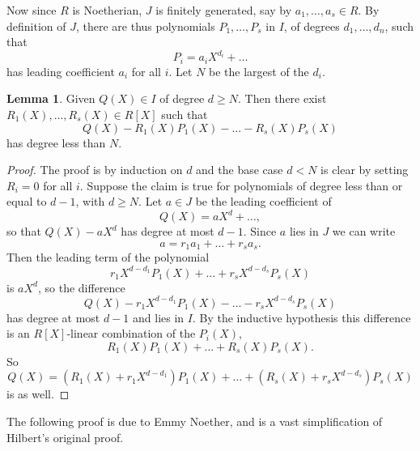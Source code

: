 \documentclass{article}
\newcommand{\rb}[1]{\left( #1 \right)}
\renewcommand{\sb}[1]{\left[ #1 \right]}
\theoremstyle{definition}\newtheorem{definition}{Definition}[subsection]
\theoremstyle{definition}\newtheorem{remark}[definition]{Remark}
\theoremstyle{definition}\newtheorem*{example}{Example}
\theoremstyle{definition}\newtheorem*{note}{Note}
\newtheorem{lemma}[definition]{Lemma}
\begin{document}
Now since $ R $ is Noetherian, $ J $ is finitely generated, say by $ a_1, \dots, a_s \in R $. By definition of $ J $, there are thus polynomials $ P_1, \dots, P_s $ in $ I $, of degrees $ d_1, \dots, d_n $, such that
$$ P_i = a_iX^{d_i} + \dots $$
has leading coefficient $ a_i $ for all $ i $. Let $ N $ be the largest of the $ d_i $.

\begin{lemma}
Given $ Q\rb{X} \in I $ of degree $ d \ge N $. Then there exist $ R_1\rb{X}, \dots, R_s\rb{X} \in R\sb{X} $ such that
$$ Q\rb{X} - R_1\rb{X}P_1\rb{X} - \dots - R_s\rb{X}P_s\rb{X} $$
has degree less than $ N $.
\end{lemma}

\begin{proof}
The proof is by induction on $ d $ and the base case $ d < N $ is clear by setting $ R_i = 0 $ for all $ i $. Suppose the claim is true for polynomials of degree less than or equal to $ d - 1 $, with $ d \ge N $. Let $ a \in J $ be the leading coefficient of
$$ Q\rb{X} = aX^d + \dots, $$
so that $ Q\rb{X} - aX^d $ has degree at most $ d - 1 $. Since $ a $ lies in $ J $ we can write
$$ a = r_1a_1 + \dots + r_sa_s. $$
Then the leading term of the polynomial
$$ r_1X^{d - d_1}P_1\rb{X} + \dots + r_sX^{d - d_s}P_s\rb{X} $$
is $ aX^d $, so the difference
$$ Q\rb{X} - r_1X^{d - d_1}P_1\rb{X} - \dots - r_sX^{d - d_s}P_s\rb{X} $$
has degree at most $ d - 1 $ and lies in $ I $. By the inductive hypothesis this difference is an $ R\sb{X} $-linear combination of the $ P_i\rb{X} $,
$$ R_1\rb{X}P_1\rb{X} + \dots + R_s\rb{X}P_s\rb{X}. $$
So
$$ Q\rb{X} = \rb{R_1\rb{X} + r_1X^{d - d_1}}P_1\rb{X} + \dots + \rb{R_s\rb{X} + r_sX^{d - d_s}}P_s\rb{X} $$
is as well.
\end{proof}

The following proof is due to Emmy Noether, and is a vast simplification of Hilbert's original proof.
\end{document}
